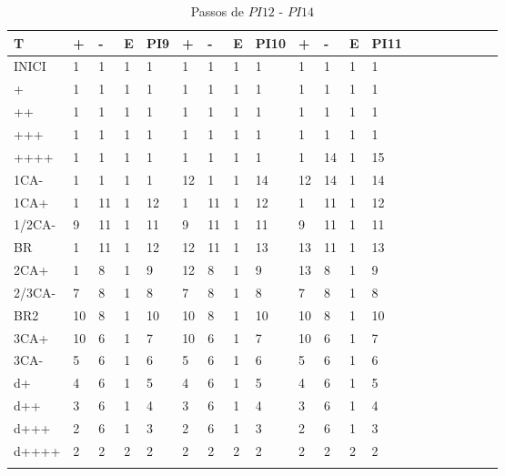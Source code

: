 \documentclass[12pt,a4paper]{report}
\begin{document}
\begin{table}[ht]
\caption{\label{tab:table-name} Passos de $PI12$ - $PI14$}
\centering
\begin{tabular}{ l l l l l l l l l l l l l l l l l l l l }
\hline
\hline
T      & +  & -  & E & PI9 & +  & -  & E & PI10 & +  & -  & E & PI11 &  &  &  &  &  &  &  \\ \hline
INICI  & 1  & 1  & 1 & 1   & 1  & 1  & 1 & 1    & 1  & 1  & 1 & 1    &  &  &  &  &  &  &  \\
+      & 1  & 1  & 1 & 1   & 1  & 1  & 1 & 1    & 1  & 1  & 1 & 1    &  &  &  &  &  &  &  \\
++     & 1  & 1  & 1 & 1   & 1  & 1  & 1 & 1    & 1  & 1  & 1 & 1    &  &  &  &  &  &  &  \\
+++    & 1  & 1  & 1 & 1   & 1  & 1  & 1 & 1    & 1  & 1  & 1 & 1    &  &  &  &  &  &  &  \\
++++   & 1  & 1  & 1 & 1   & 1  & 1  & 1 & 1    & 1  & 14 & 1 & 15   &  &  &  &  &  &  &  \\
1CA-   & 1  & 1  & 1 & 1   & 12 & 1  & 1 & 14   & 12 & 14 & 1 & 14   &  &  &  &  &  &  &  \\
1CA+   & 1  & 11 & 1 & 12  & 1  & 11 & 1 & 12   & 1  & 11 & 1 & 12   &  &  &  &  &  &  &  \\
1/2CA- & 9  & 11 & 1 & 11  & 9  & 11 & 1 & 11   & 9  & 11 & 1 & 11   &  &  &  &  &  &  &  \\
BR     & 1  & 11 & 1 & 12  & 12 & 11 & 1 & 13   & 13 & 11 & 1 & 13   &  &  &  &  &  &  &  \\
2CA+   & 1  & 8  & 1 & 9   & 12 & 8  & 1 & 9    & 13 & 8  & 1 & 9    &  &  &  &  &  &  &  \\
2/3CA- & 7  & 8  & 1 & 8   & 7  & 8  & 1 & 8    & 7  & 8  & 1 & 8    &  &  &  &  &  &  &  \\
BR2    & 10 & 8  & 1 & 10  & 10 & 8  & 1 & 10   & 10 & 8  & 1 & 10   &  &  &  &  &  &  &  \\
3CA+   & 10 & 6  & 1 & 7   & 10 & 6  & 1 & 7    & 10 & 6  & 1 & 7    &  &  &  &  &  &  &  \\
3CA-   & 5  & 6  & 1 & 6   & 5  & 6  & 1 & 6    & 5  & 6  & 1 & 6    &  &  &  &  &  &  &  \\
d+     & 4  & 6  & 1 & 5   & 4  & 6  & 1 & 5    & 4  & 6  & 1 & 5    &  &  &  &  &  &  &  \\
d++    & 3  & 6  & 1 & 4   & 3  & 6  & 1 & 4    & 3  & 6  & 1 & 4    &  &  &  &  &  &  &  \\
d+++   & 2  & 6  & 1 & 3   & 2  & 6  & 1 & 3    & 2  & 6  & 1 & 3    &  &  &  &  &  &  &  \\
d++++  & 2  & 2  & 2 & 2   & 2  & 2  & 2 & 2    & 2  & 2  & 2 & 2    &  &  &  &  &  &  &  \\
       &    &    &   &     &    &    &   &      &    &    &   &      &  &  &  &  &  &  & \\
       \hline
\end{tabular}
\end{table}
\end{document}
